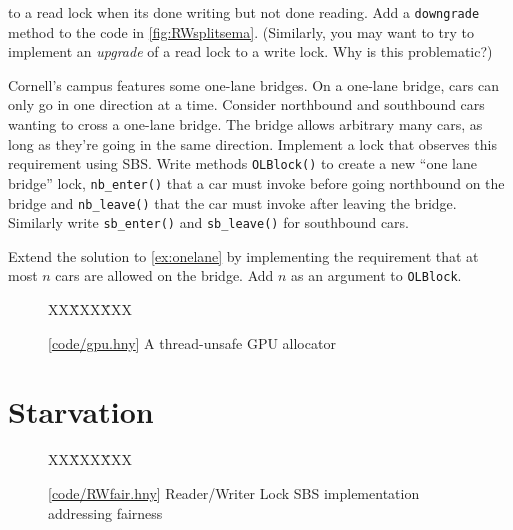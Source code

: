 \documentclass{report}
\newcommand{\harmonysource}[1]{
\begin{tabbing}
XX\=XXX\=XXX\kill
    
\end{tabbing}
}
\newcommand{\harmonylink}[1]{%
[\href{https://harmony.cs.cornell.edu/#1}{\underline{#1}}]%
}
\newenvironment{code}{
\tcolorbox
}{
\endtcolorbox
}
\begin{document}
\begin{problems}
to a read lock when its done writing but not done reading.  Add
a \texttt{downgrade} method to the code in \autoref{fig:RWsplitsema}.
(Similarly, you may want to try to implement an \emph{upgrade} of a
read lock to a write lock.  Why is this problematic?)
\item \label{ex:onelane} Cornell's campus features some one-lane bridges.
On a one-lane bridge,
cars can only go in one direction at a time. Consider northbound
and southbound cars wanting to cross a one-lane bridge.
The bridge allows arbitrary many cars, as long as they're going in the
same direction.
Implement a lock that observes this requirement using SBS.
Write methods \texttt{OLBlock()} to create a new ``one lane bridge'' lock,
\texttt{nb\_enter()} that a car must invoke before going northbound on
the bridge and \texttt{nb\_leave()} that the car must invoke after leaving
the bridge.  Similarly write \texttt{sb\_enter()} and \texttt{sb\_leave()}
for southbound cars.
\item Extend the solution to \autoref{ex:onelane} by implementing the
requirement that at most $n$ cars are allowed on the bridge.  Add $n$
as an argument to \texttt{OLBlock}.

\end{problems}

\begin{figure}
\begin{code}
\harmonysource{gpu}
\end{code}
\caption{\harmonylink{code/gpu.hny} A thread-unsafe GPU allocator}
\label{fig:gpu}
\end{figure}

\chapter{Starvation}
\label{ch:starvation}
%

%

\begin{figure}
\begin{code}
{\small
\harmonysource{RWfair}
}
\end{code}
\caption{\harmonylink{code/RWfair.hny} Reader/Writer Lock SBS implementation addressing fairness}
\label{fig:RWfair}
\end{figure}
\end{document}
